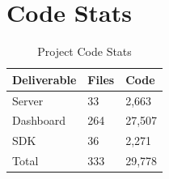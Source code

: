 

\section{Code Stats}

\begin{table}[!h]
\centering
\caption{Project Code Stats}
\label{my-label}
\begin{tabular}{|l|l|l|}
\hline
\rowcolor{green!20}
Deliverable & Files & Code   \\ \hline
Server      & 33    & 2,663  \\ \hline
Dashboard   & 264   & 27,507 \\ \hline
SDK         & 36    & 2,271  \\ \hline
Total       & 333   & 29,778 \\ \hline
\end{tabular}
\end{table}